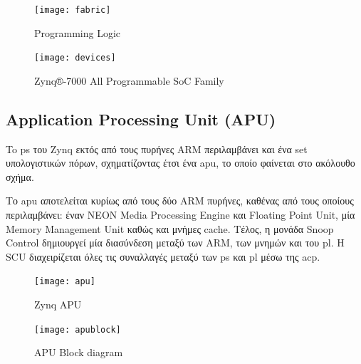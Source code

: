 \begin{figure}[H]
  	\centering
	\texttt{[image: fabric]}\\
	\caption{Programming Logic \cite{Crockett:2014:ZBE:2685817}}
\end{figure}
\begin{figure}[H]{}
  	\centering
	\texttt{[image: devices]}\\
	\caption{Zynq®-7000 All Programmable SoC Family \cite{Zynq700083:online}}
\end{figure}

\subsection{Application Processing Unit (APU)}

To \gls{ps} του Zynq εκτός από τους πυρήνες ARM περιλαμβάνει και ένα set υπολογιστικών πόρων, σχηματίζοντας έτσι ένα \gls{apu}, το οποίο φαίνεται στο ακόλουθο σχήμα.

Το \gls{apu} αποτελείται κυρίως από τους δύο ARM πυρήνες, καθένας από τους οποίους περιλαμβάνει: έναν NEON Media Processing Engine και Floating Point Unit, μία Memory Management Unit καθώς και μνήμες cache. Τέλος, η μονάδα Snoop Control δημιουργεί μία διασύνδεση μεταξύ των ARM, των μνημών και του \gls{pl}. Η SCU διαχειρίζεται όλες τις συναλλαγές μεταξύ των \gls{ps} και \gls{pl} μέσω της \gls{acp}.
\begin{figure}[H]{}
  	\centering
	\texttt{[image: apu]}\\
	\caption{Zynq APU \cite{Crockett:2014:ZBE:2685817}}
\end{figure}
\begin{figure}[H]{}
  	\centering
	\texttt{[image: apublock]}\\
	\caption{APU Block diagram \cite{Crockett:2014:ZBE:2685817}}
\end{figure}

